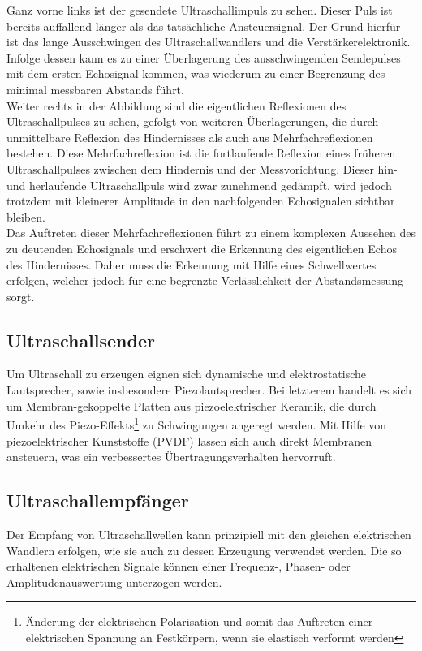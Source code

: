 Ganz vorne links ist der gesendete Ultraschallimpuls zu sehen. Dieser Puls ist bereits auffallend länger als das tatsächliche Ansteuersignal. Der Grund hierfür ist das lange Ausschwingen des Ultraschallwandlers und die Verstärkerelektronik. Infolge dessen kann es zu einer Überlagerung des ausschwingenden Sendepulses mit dem ersten Echosignal kommen, was wiederum zu einer Begrenzung des minimal messbaren Abstands führt.\\
Weiter rechts in der Abbildung sind die eigentlichen Reflexionen des Ultraschallpulses zu sehen, gefolgt von weiteren Überlagerungen, die durch unmittelbare Reflexion des Hindernisses als auch aus Mehrfachreflexionen bestehen. Diese Mehrfachreflexion ist die fortlaufende Reflexion eines früheren Ultraschallpulses zwischen dem Hindernis und der Messvorichtung. Dieser hin- und herlaufende Ultraschallpuls wird zwar zunehmend gedämpft, wird jedoch trotzdem mit kleinerer Amplitude in den nachfolgenden Echosignalen sichtbar bleiben.\\
Das Auftreten dieser Mehrfachreflexionen führt zu einem komplexen Aussehen des zu deutenden Echosignals und erschwert die Erkennung des eigentlichen Echos des Hindernisses. Daher muss die Erkennung mit Hilfe eines Schwellwertes erfolgen, welcher jedoch für eine begrenzte Verlässlichkeit der Abstandsmessung sorgt.

\subsection{Ultraschallsender}
Um Ultraschall zu erzeugen eignen sich dynamische und elektrostatische Lautsprecher, sowie insbesondere Piezolautsprecher.  Bei letzterem handelt es sich um Membran-gekoppelte Platten aus piezoelektrischer Keramik, die durch Umkehr des Piezo-Effekts\footnote{Änderung der elektrischen Polarisation und somit das Auftreten einer elektrischen Spannung an Festkörpern, wenn sie elastisch verformt werden} zu Schwingungen angeregt werden. Mit Hilfe von piezoelektrischer Kunststoffe (PVDF) lassen sich auch direkt Membranen ansteuern, was ein verbessertes Übertragungsverhalten hervorruft.

\subsection{Ultraschallempfänger}
Der Empfang von Ultraschallwellen kann prinzipiell mit den gleichen elektrischen Wandlern erfolgen, wie sie auch zu dessen Erzeugung verwendet werden. Die so erhaltenen elektrischen Signale können einer Frequenz-, Phasen- oder Amplitudenauswertung unterzogen werden.

